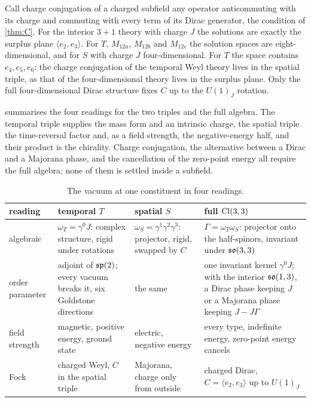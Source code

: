 \begin{example}
\label{ex:subC}
Call charge conjugation of a charged subfield any operator anticommuting with its charge and commuting with every term of its Dirac generator,
the condition of \cref{thm:C}. For the interior $3{+}1$ theory with charge $J$ the solutions are exactly the surplus plane $\langle e_2,e_3\rangle$.
For $T$, $M_{12a}$, $M_{12b}$ and $M_{12c}$ the solution spaces are eight-dimensional, and for $S$ with charge $J$ four-dimensional. For $T$ the
space contains $e_4,e_5,e_6$: the charge conjugation of the temporal Weyl theory lives in the spatial triple, as that of the four-dimensional
theory lives in the surplus plane. Only the full four-dimensional Dirac structure fixes $C$ up to the $U(1)_J$ rotation.
\end{example}

 summarises the four readings for the two triples and the full algebra. The temporal triple supplies the mass form and
an intrinsic charge, the spatial triple the time-reversal factor and, as a field strength, the negative-energy half, and their product is the
chirality. Charge conjugation, the alternative between a Dirac and a Majorana phase, and the cancellation of the zero-point energy all require
the full algebra; none of them is settled inside a subfield.

\begin{table}[t]
\centering
\small
\begin{tabular}{@{}>{\raggedright\arraybackslash}p{2.2cm}>{\raggedright\arraybackslash}p{3.6cm}>{\raggedright\arraybackslash}p{3.6cm}>{\raggedright\arraybackslash}p{5.0cm}@{}}
\toprule
reading & temporal $T$ & spatial $S$ & full $\mathrm{Cl}(3,3)$\\
\midrule
algebraic & $\omega_T=\gamma^0J$: complex structure, rigid under rotations & $\omega_S=\gamma^1\gamma^2\gamma^3$: projector, rigid, swapped by $C$ &
$\Gamma=\omega_T\omega_S$: projector onto the half-spinors, invariant under $\mathfrak{so}(3,3)$\\
order parameter & adjoint of $\mathfrak{sp}(2)$; every vacuum breaks it, six Goldstone directions & the same & one invariant kernel $\gamma^0J$; with the interior
$\mathfrak{so}(1,3)$, a Dirac phase keeping $J$ or a Majorana phase keeping $J-J\Gamma$\\
field strength & magnetic, positive energy, ground state & electric, negative energy & every type, indefinite energy, zero-point energy cancels\\
Fock & charged Weyl, $C$ in the spatial triple & Majorana, charge only from outside & charged Dirac, $C=\langle e_2,e_3\rangle$ up to $U(1)_J$\\
\bottomrule
\end{tabular}
\caption{The vacuum at one constituent in four readings.}
\label{tab:fourreadings}
\end{table}
